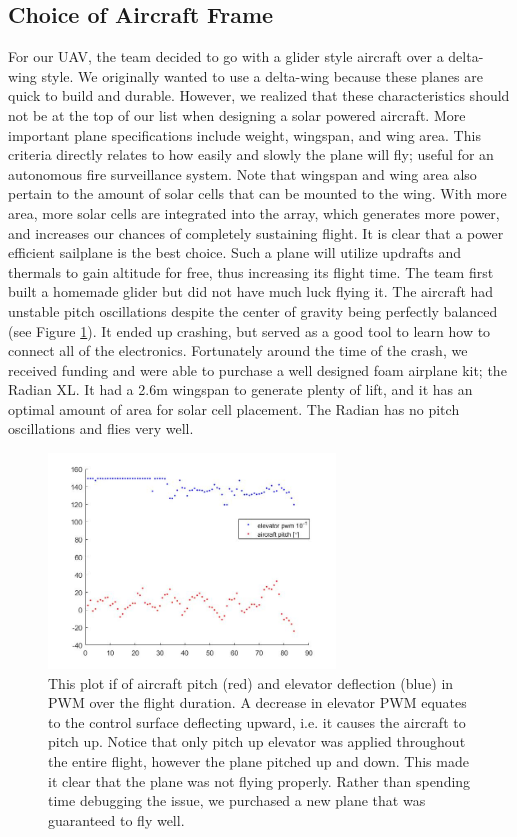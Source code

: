 \documentclass[12pt,journal,compsoc]{IEEEtran}
\begin{document}
\subsection{Choice of Aircraft Frame}
For our UAV, the team decided to go with a glider style aircraft over a delta-wing style. We originally wanted to use a delta-wing because these planes are quick to build and durable. However, we realized that these characteristics should not be at the top of our list when designing a solar powered aircraft. More important plane specifications include weight, wingspan, and wing area. This criteria directly relates to how easily and slowly the plane will fly; useful for an autonomous fire surveillance system. Note that wingspan and wing area also pertain to the amount of solar cells that can be mounted to the wing. With more area, more solar cells are integrated into the array, which generates more power, and increases our chances of completely sustaining flight. It is clear that a power efficient sailplane is the best choice. Such a plane will utilize updrafts and thermals to gain altitude for free, thus increasing its flight time. The team first built a homemade glider but did not have much luck flying it. The aircraft had unstable pitch oscillations despite the center of gravity being perfectly balanced (see Figure \ref{pitchOsc}). It ended up crashing, but served as a good tool to learn how to connect all of the electronics. Fortunately around the time of the crash, we received funding and were able to purchase a well designed foam airplane kit; the Radian XL. It had a 2.6m wingspan to generate plenty of lift, and it has an optimal amount of area for solar cell placement. The Radian has no pitch oscillations and flies very well.
\begin{figure}[h!]
\hspace*{0cm}
\centering
\includegraphics[width=3in]{pitch_elevPWM.jpg}
\caption{This plot if of aircraft pitch (red) and elevator deflection (blue) in PWM over the flight duration. A decrease in elevator PWM equates to the control surface deflecting upward, i.e. it causes the aircraft to pitch up. Notice that only pitch up elevator was applied throughout the entire flight, however the plane pitched up and down. This made it clear that the plane was not flying properly. Rather than spending time debugging the issue, we purchased a new plane that was guaranteed to fly well.}
\label{pitchOsc}
\end{figure}
\end{document}
